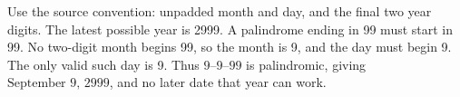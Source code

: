 Use the source convention: unpadded month and day, and the final two year digits. The latest possible year is 2999. A palindrome ending in 99 must start in 99. No two-digit month begins 99, so the month is 9, and the day must begin 9. The only valid such day is 9. Thus $\text{9--9--99}$ is palindromic, giving $\boxed{\text{September 9, 2999}}$, and no later date that year can work.
